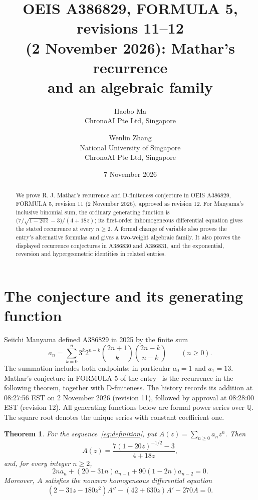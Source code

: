 \documentclass[11pt]{article}
\title{OEIS A386829, FORMULA 5, revisions 11--12\\
(2 November 2026): Mathar's recurrence\\
and an algebraic family}
\author{Haobo Ma\\\small ChronoAI Pte Ltd, Singapore
\and Wenlin Zhang\\\small National University of Singapore\\\small ChronoAI Pte Ltd, Singapore}
\date{7 November 2026}
\newtheorem{theorem}{Theorem}
\newcommand{\Q}{\mathbb{Q}}
\begin{document}
\maketitle
\begin{abstract}
We prove R. J. Mathar's recurrence and D-finiteness conjecture in
OEIS A386829, FORMULA 5, revision 11 (2 November 2026), approved as revision 12.
For Manyama's inclusive binomial sum, the ordinary generating function is
$\bigl(7/\sqrt{1-20z}-3\bigr)/(4+18z)$; its first-order
inhomogeneous differential equation gives the stated recurrence at every
$n\geq2$. A formal change of variable also proves the entry's alternative
formulas and gives a two-weight algebraic family. It also proves the
displayed recurrence conjectures in A386830 and A386831, and the
exponential, reversion and hypergeometric identities in related entries.
\end{abstract}

\section{The conjecture and its generating function}
Seiichi Manyama defined A386829 in 2025 by the finite sum
\begin{equation}\label{eq:definition}
 a_n=\sum_{k=0}^{n}3^k2^{n-k}
       \binom{2n+1}{k}\binom{2n-k}{n-k}\qquad(n\geq0).
\end{equation}
The summation includes both endpoints; in particular $a_0=1$ and $a_1=13$.
Mathar's conjecture in FORMULA 5 of the entry~\cite{oeis829}
is the recurrence in the following theorem, together with D-finiteness.
The history records its addition at 08:27:56 EST on 2 November 2026
(revision 11), followed by approval at 08:28:00 EST (revision 12).
All generating functions below are formal power series over $\Q$.
The square root denotes the unique series with constant coefficient one.

\begin{theorem}\label{thm:main}
For the sequence~\eqref{eq:definition}, put $A(z)=\sum_{n\geq0}a_nz^n$.
Then
\begin{equation}\label{eq:gf}
 A(z)=\frac{7(1-20z)^{-1/2}-3}{4+18z},
\end{equation}
and, for every integer $n\geq2$,
\begin{equation}\label{eq:recurrence}
 2n a_n+(20-31n)a_{n-1}+90(1-2n)a_{n-2}=0.
\end{equation}
Moreover, $A$ satisfies the nonzero homogeneous differential equation
\begin{equation}\label{eq:ode}
 (2-31z-180z^2)A''-(42+630z)A'-270A=0.
\end{equation}
\end{theorem}
\end{document}
